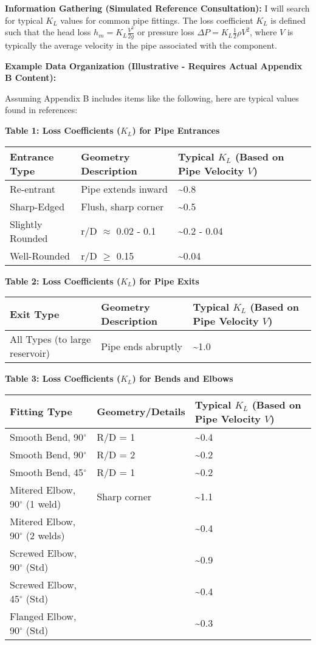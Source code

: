 \textbf{Information Gathering (Simulated Reference Consultation):} I
will search for typical \(K_L\) values for common pipe fittings. The
loss coefficient \(K_L\) is defined such that the head loss
\(h_m = K_L \frac{V^2}{2g}\) or pressure loss
\(\Delta P = K_L \frac{1}{2} \rho V^2\), where \(V\) is typically the
average velocity in the pipe associated with the component.

\textbf{Example Data Organization (Illustrative - Requires Actual
Appendix B Content):}

Assuming Appendix B includes items like the following, here are typical
values found in references:

\textbf{Table 1: Loss Coefficients (\(K_L\)) for Pipe Entrances}

\begin{longtable}[]{@{}lll@{}}
\toprule
Entrance Type & Geometry Description & Typical \(K_L\) (Based on Pipe
Velocity \(V\))\tabularnewline
\midrule
\endhead
Re-entrant & Pipe extends inward & \textasciitilde0.8\tabularnewline
Sharp-Edged & Flush, sharp corner & \textasciitilde0.5\tabularnewline
Slightly Rounded & r/D \(\approx\) 0.02 - 0.1 & \textasciitilde0.2 -
0.04\tabularnewline
Well-Rounded & r/D \(\geq\) 0.15 & \textasciitilde0.04\tabularnewline
\bottomrule
\end{longtable}

\textbf{Table 2: Loss Coefficients (\(K_L\)) for Pipe Exits}

\begin{longtable}[]{@{}lll@{}}
\toprule
Exit Type & Geometry Description & Typical \(K_L\) (Based on Pipe
Velocity \(V\))\tabularnewline
\midrule
\endhead
All Types (to large reservoir) & Pipe ends abruptly &
\textasciitilde1.0\tabularnewline
\bottomrule
\end{longtable}

\textbf{Table 3: Loss Coefficients (\(K_L\)) for Bends and Elbows}

\begin{longtable}[]{@{}lll@{}}
\toprule
Fitting Type & Geometry/Details & Typical \(K_L\) (Based on Pipe
Velocity \(V\))\tabularnewline
\midrule
\endhead
Smooth Bend, 90\(^\circ\) & R/D = 1 & \textasciitilde0.4\tabularnewline
Smooth Bend, 90\(^\circ\) & R/D = 2 & \textasciitilde0.2\tabularnewline
Smooth Bend, 45\(^\circ\) & R/D = 1 & \textasciitilde0.2\tabularnewline
Mitered Elbow, 90\(^\circ\) (1 weld) & Sharp corner &
\textasciitilde1.1\tabularnewline
Mitered Elbow, 90\(^\circ\) (2 welds) & &
\textasciitilde0.4\tabularnewline
Screwed Elbow, 90\(^\circ\) (Std) & & \textasciitilde0.9\tabularnewline
Screwed Elbow, 45\(^\circ\) (Std) & & \textasciitilde0.4\tabularnewline
Flanged Elbow, 90\(^\circ\) (Std) & & \textasciitilde0.3\tabularnewline
\bottomrule
\end{longtable}

